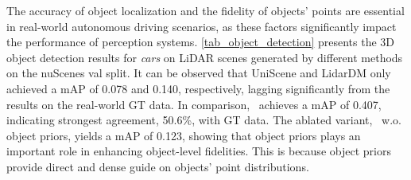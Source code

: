 \begin{table}[h]
\centering
{}
\caption{3D object detection results on LiDAR scenes generated by different method on the nuScenes val split. (Please refer to the supplementary material for a visualization of detected objects.)}
\label{tab_object_detection}
\end{table}


The accuracy of object localization and the fidelity of objects' points are essential in real-world autonomous driving scenarios, as these factors significantly impact the performance of perception systems.
\cref{tab_object_detection} presents the 3D object detection results for \textit{cars} on LiDAR scenes generated by different methods on the nuScenes val split. It can be observed that UniScene and LidarDM only achieved a mAP of 0.078 and 0.140, respectively, lagging significantly from the results on the real-world GT data. In comparison, \sysname\ achieves a mAP of 0.407, indicating strongest agreement, 50.6\%, with GT data. The ablated variant, \sysname\ w.o. object priors, yields a mAP of 0.123, showing that object priors plays an important role in enhancing object-level fidelities. This is because object priors provide direct and dense guide on objects' point distributions. 
